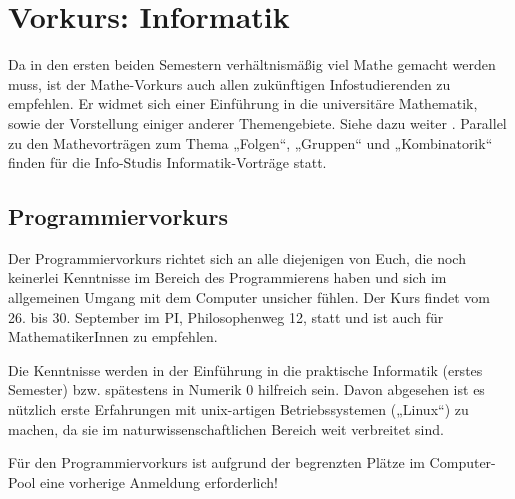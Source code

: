 \section{Vorkurs: Informatik}
\label{vkinfo}
Da in den ersten beiden Semestern verhältnismäßig viel Mathe gemacht werden muss, ist der Mathe-Vorkurs auch allen zukünftigen Infostudierenden zu empfehlen. Er widmet sich einer Einführung in die universitäre Mathematik, sowie der Vorstellung einiger anderer Themengebiete. Siehe dazu weiter
.
Parallel zu den Mathevorträgen zum Thema „Folgen“, „Gruppen“ und „Kombinatorik“ finden für die Info-Studis Informatik-Vorträge statt.

\parskip

\subsection{Programmiervorkurs}
Der Programmiervorkurs richtet sich an alle diejenigen von Euch, die noch
keinerlei Kenntnisse im Bereich des Programmierens haben und sich im
allgemeinen Umgang mit dem Computer unsicher fühlen. Der Kurs findet vom 26.
bis 30. September im \gls{PI}, \gls{Philosophenweg} 12, statt und ist auch für
MathematikerInnen zu empfehlen.

Die Kenntnisse werden in der Einführung in die praktische Informatik (erstes
Semester) bzw. spätestens in Numerik 0 hilfreich sein. Davon abgesehen ist es
nützlich erste Erfahrungen mit unix-artigen Betriebssystemen („Linux“) zu
machen, da sie im naturwissenschaftlichen Bereich weit verbreitet sind.

Für den Programmiervorkurs ist aufgrund der begrenzten Plätze im Computer-Pool
eine vorherige Anmeldung erforderlich!
